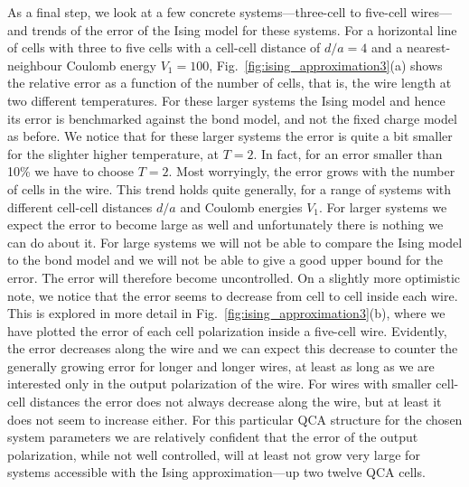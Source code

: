 As a final step, we look at a few concrete systems---three-cell to five-cell
wires---and trends of the error of the Ising model for these systems. For
a horizontal line of cells with three to five cells with a cell-cell distance of
$d/a = 4$ and a nearest-neighbour Coulomb energy $V_1 = 100$,
Fig.~\ref{fig:ising_approximation3}(a) shows the relative error as a function of
the number of cells, that is, the wire length at two different temperatures. For
these larger systems the Ising model and hence its error is benchmarked against
the bond model, and not the fixed charge model as before. We notice that for
these larger systems the error is quite a bit smaller for the slighter higher
temperature, at $T = 2$. In fact, for an error smaller than 10\% we have to
choose $T = 2$. Most worryingly, the error grows with the number of cells in the
wire. This trend holds quite generally, for a range of systems with different
cell-cell distances $d/a$ and Coulomb energies $V_1$. For larger systems we
expect the error to become large as well and unfortunately there is nothing we
can do about it. For large systems we will not be able to compare the Ising
model to the bond model and we will not be able to give a good upper bound for
the error. The error will therefore become uncontrolled. On a slightly more
optimistic note, we notice that the error seems to decrease from cell to cell
inside each wire. This is explored in more detail in
Fig.~\ref{fig:ising_approximation3}(b), where we have plotted the error of each
cell polarization inside a five-cell wire. Evidently, the error decreases along
the wire and we can expect this decrease to counter the generally growing error
for longer and longer wires, at least as long as we are interested only in the
output polarization of the wire. For wires with smaller cell-cell distances the
error does not always decrease along the wire, but at least it does not seem to
increase either. For this particular QCA structure for the chosen system
parameters we are relatively confident that the error of the output
polarization, while not well controlled, will at least not grow very large for
systems accessible with the Ising approximation---up two twelve QCA cells. 
% 
%
